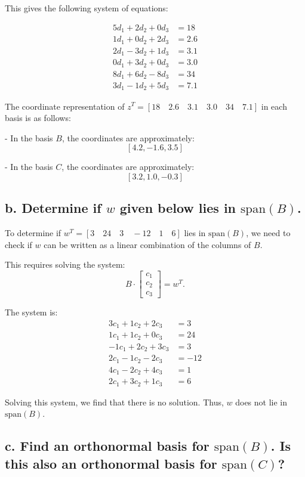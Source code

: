 \documentclass{article}
\begin{document}
This gives the following system of equations:

\[
\begin{aligned}
5d_1 + 2d_2 + 0d_3 &= 18 \\
1d_1 + 0d_2 + 2d_3 &= 2.6 \\
2d_1 - 3d_2 + 1d_3 &= 3.1 \\
0d_1 + 3d_2 + 0d_3 &= 3.0 \\
8d_1 + 6d_2 - 8d_3 &= 34 \\
3d_1 - 1d_2 + 5d_3 &= 7.1
\end{aligned}
\]

The coordinate representation of \( z^T = [18 \quad 2.6 \quad 3.1 \quad 3.0 \quad 34 \quad 7.1] \) in each basis is as follows:

- In the basis \( B \), the coordinates are approximately:
\[
[4.2, -1.6, 3.5]
\]

- In the basis \( C \), the coordinates are approximately:
\[
[3.2, 1.0, -0.3]
\]

\subsection*{b. Determine if \( w \) given below lies in \( \text{span}(B) \).}

To determine if \( w^T = [3 \quad 24 \quad 3 \quad -12 \quad 1 \quad 6] \) lies in \( \text{span}(B) \), we need to check if \( w \) can be written as a linear combination of the columns of \( B \).

This requires solving the system:
\[
B \cdot \begin{bmatrix} c_1 \\ c_2 \\ c_3 \end{bmatrix} = w^T.
\]

The system is:
\[
\begin{aligned}
3c_1 + 1c_2 + 2c_3 &= 3 \\
1c_1 + 1c_2 + 0c_3 &= 24 \\
-1c_1 + 2c_2 + 3c_3 &= 3 \\
2c_1 - 1c_2 - 2c_3 &= -12 \\
4c_1 - 2c_2 + 4c_3 &= 1 \\
2c_1 + 3c_2 + 1c_3 &= 6
\end{aligned}
\]

Solving this system, we find that there is no solution. Thus, \( w \) does not lie in \( \text{span}(B) \).

\subsection*{c. Find an orthonormal basis for \( \text{span}(B) \). Is this also an orthonormal basis for \( \text{span}(C) \)?}
\end{document}
